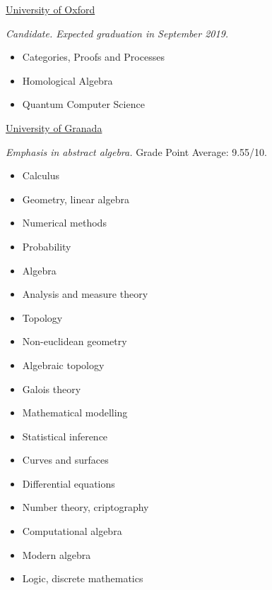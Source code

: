 \documentclass[nocolors]{friggeri-cv-a4}
\begin{document}
\begin{entrylist}


  {\href{https://www.ox.ac.uk/admissions/graduate/courses/msc-mathematics-and-foundations-computer-science?wssl=1}
    {University of Oxford}}
  {\emph{Candidate. Expected graduation in September 2019.} {\small
    \begin{multicols}{2}
      \begin{itemize}[topsep=0pt]
      \item Categories, Proofs and Processes
      \item Homological Algebra
      \item Quantum Computer Science
      \end{itemize}
    \end{multicols}
  }}
  
  
{\href{http://www.ugr.es/en/}{University of Granada}}
{\emph{Emphasis in abstract algebra.} Grade Point Average: 9.55/10.
  {\small
  \begin{multicols}{2}
    \begin{itemize}[topsep=0pt]
    \item Calculus
    \item Geometry, linear algebra
    \item Numerical methods
    \item Probability
    \item Algebra
    \item Analysis and measure theory
    \item Topology
    \item Non-euclidean geometry
    \item Algebraic topology
    \item Galois theory
    \item Mathematical modelling
    \item Statistical inference
    \item Curves and surfaces
    \item Differential equations
    \item Number theory, criptography
    \item Computational algebra
    \item Modern algebra
    \item Logic, discrete mathematics
    \end{itemize}
  \end{multicols}
  }
}


\end{entrylist}
\end{document}
